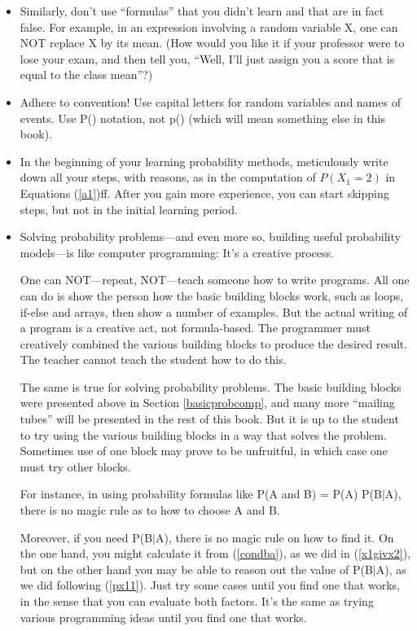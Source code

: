 \begin{itemize}
\item Similarly, don't use ``formulas'' that you didn't learn and that
are in fact false.  For example, in an expression involving a random
variable X, one can NOT replace X by its mean.  (How would you like it
if your professor were to lose your exam, and then tell you, ``Well,
I'll just assign you a score that is equal to the class mean''?)

\item Adhere to convention!  Use capital letters for random variables
and names of events.  Use P() notation, not p() (which will mean
something else in this book).

\item In the beginning of your learning probability methods,
meticulously write down all your steps, with reasons, as in the
computation of $P(X_1 = 2)$ in Equations (\ref{a1})ff.  After you gain
more experience, you can start skipping steps, but not in the initial
learning period.

\item Solving probability problems---and even more so, building useful
probability models---is like computer programming:  It's a creative
process.

One can NOT---repeat, NOT---teach someone how to write programs.  All
one can do is show the person how the basic building blocks work, such
as loops, if-else and arrays, then show a number of examples.  But the
actual writing of a program is a creative act, not formula-based.  The
programmer must creatively combined the various building blocks to
produce the desired result.  The teacher cannot teach the student how to
do this.

The same is true for solving probability problems.  The basic building
blocks were presented above in Section \ref{basicprobcomp}, and many
more ``mailing tubes'' will be presented in the rest of this book.  But
it is up to the student to try using the various building blocks in a
way that solves the problem.  Sometimes use of one block may prove to be
unfruitful, in which case one must try other blocks.

For instance, in using probability formulas like P(A and B) = P(A)
P(B$|$A), there is no magic rule as to how to choose A and B.  

Moreover, if you need P(B$|$A), there is no magic rule on how to find
it.  On the one hand, you might calculate it from (\ref{condba}), as we
did in (\ref{x1givx2}), but on the other hand you may be able to reason
out the value of P(B$|$A), as we did following (\ref{px11}).  Just try
some cases until you find one that works, in the sense that you can
evaluate both factors.  It's the same as trying various programming
ideas until you find one that works.

\end{itemize}


